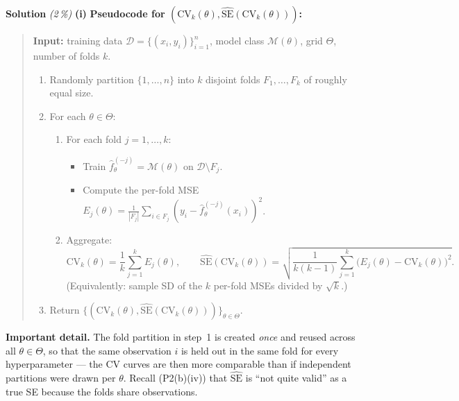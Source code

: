 \documentclass[11pt,a4paper]{article}
\newcommand{\subpoints}[1]{\textit{(#1\,\%)}}
\newcommand{\sol}{\noindent\textbf{Solution}}
\begin{document}
\sol{} \subpoints{2} \textbf{(i)} \textbf{Pseudocode for $(\mathrm{CV}_k(\theta), \widehat{\mathrm{SE}}(\mathrm{CV}_k(\theta)))$:}
\begin{quote}\small
\textbf{Input:} training data $\mathcal D = \{(x_i, y_i)\}_{i=1}^n$, model class $\mathcal M(\theta)$,
grid $\Theta$, number of folds $k$.
\begin{enumerate}
  \item Randomly partition $\{1, \dots, n\}$ into $k$ disjoint folds $F_1, \dots, F_k$ of roughly
        equal size.
  \item For each $\theta \in \Theta$:
    \begin{enumerate}
      \item For each fold $j = 1, \dots, k$:
        \begin{itemize}
          \item Train $\hat f^{(-j)}_\theta = \mathcal M(\theta)$ on $\mathcal D \setminus F_j$.
          \item Compute the per-fold MSE
          $E_j(\theta) = \tfrac{1}{|F_j|}\sum_{i \in F_j} (y_i - \hat f^{(-j)}_\theta(x_i))^2$.
        \end{itemize}
      \item Aggregate:
        $$\mathrm{CV}_k(\theta) = \frac{1}{k}\sum_{j=1}^k E_j(\theta),
        \qquad
        \widehat{\mathrm{SE}}(\mathrm{CV}_k(\theta))
           = \sqrt{\frac{1}{k(k-1)}\sum_{j=1}^k \bigl(E_j(\theta) - \mathrm{CV}_k(\theta)\bigr)^2}.$$
        (Equivalently: sample SD of the $k$ per-fold MSEs divided by $\sqrt{k}$.)
    \end{enumerate}
  \item Return $\{(\mathrm{CV}_k(\theta), \widehat{\mathrm{SE}}(\mathrm{CV}_k(\theta)))\}_{\theta \in \Theta}$.
\end{enumerate}
\end{quote}
\textbf{Important detail.} The fold partition in step~1 is created \emph{once} and reused across
all $\theta \in \Theta$, so that the same observation $i$ is held out in the same fold for every
hyperparameter --- the CV curves are then more comparable than if independent partitions were drawn
per $\theta$. Recall (P2(b)(iv)) that $\widehat{\mathrm{SE}}$ is ``not quite valid'' as a true SE
because the folds share observations.
\end{document}

